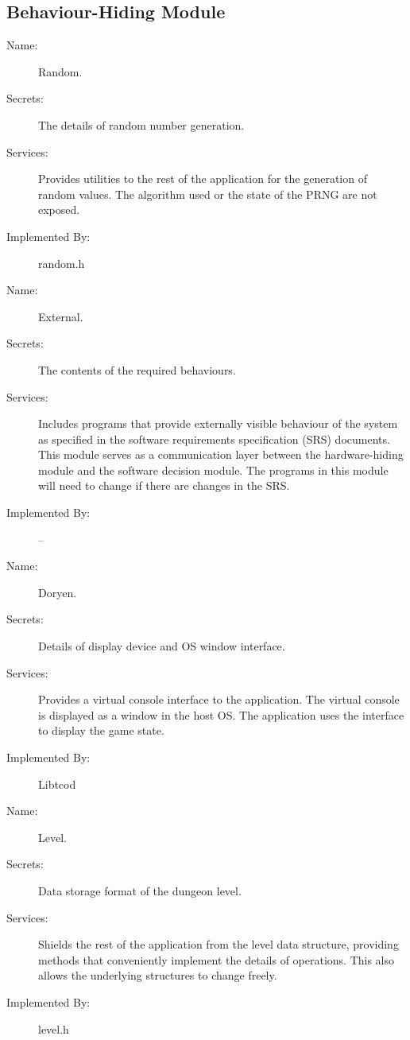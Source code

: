 \documentclass[12pt, titlepage]{article}
\begin{document}
	\subsection{Behaviour-Hiding Module}

		\bigskip\begin{description}
			\item[Name:]Random.
			\item[Secrets:]The details of random number generation.
			\item[Services:]Provides utilities to the rest of the application for the generation of random
			values. The algorithm used or the state of the PRNG are not exposed.
			\item[Implemented By:] random.h
		\end{description}

		\bigskip\begin{description}
			\item[Name:]External.
			\item[Secrets:]The contents of the required behaviours.
			\item[Services:]Includes programs that provide externally visible behaviour of the system as specified in the software requirements specification (SRS) documents. This module serves as a communication layer between the hardware-hiding module and the software decision module. The programs in this module will need to change if there are changes in the SRS.
			\item[Implemented By:] --
		\end{description}

		\bigskip\begin{description}
			\item[Name:]Doryen.
			\item[Secrets:]Details of display device and OS window interface.
			\item[Services:]Provides a virtual console interface to the application. The virtual console is displayed as a window in the host OS. The application uses the interface to display the game state.
			\item[Implemented By:]Libtcod
		\end{description}

		\bigskip\begin{description}
			\item[Name:]Level.
			\item[Secrets:]Data storage format of the dungeon level.
			\item[Services:]Shields the rest of the application from the level data structure, providing methods that conveniently implement the details of operations. This also allows the underlying structures to change freely.
			\item[Implemented By:]level.h
		\end{description}
\end{document}
